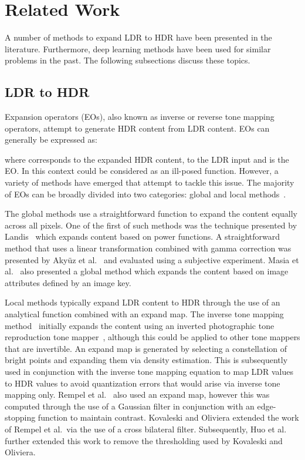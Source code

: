 \documentclass{egpubl}
\begin{document}
\section{\textbf{Related Work}}

A number of methods to expand LDR to HDR have been presented in the literature. Furthermore, deep learning methods have been used for similar
problems in the past. The following subsections discuss these topics.

\subsection{\textbf{LDR to HDR}}
Expansion operators (EOs), also known as inverse or reverse tone mapping operators, attempt to generate HDR content from LDR content. EOs can
generally be expressed as:



\noindent where  corresponds to the expanded HDR content,  to the LDR input and  is the EO. In this context  could be
considered as an ill-posed function. However, a variety of methods have emerged that attempt to tackle this issue. The majority of EOs can be broadly
divided into two categories: global and local methods~\cite{banterle2011hdrbook}.

The global methods use a straightforward function to expand the content equally
across all pixels. One of the first of such methods was the technique presented
by Landis~\cite{Landis02} which expands content based on power functions. A
straightforward method that uses a linear transformation combined with gamma
correction was presented by Aky\"{u}z et al.~\cite{akyuz06} and evaluated using
a subjective experiment. Masia et al.~\cite{masia09,masia2017dynamic} also
presented a global method which expands the content based on image attributes
defined by an image key.

Local methods typically expand LDR content to HDR through the use of an
analytical function combined with an expand map. The inverse tone mapping
method~\cite{banterle06inverse} initially expands the content using an inverted
photographic tone reproduction tone mapper~\cite{reinhard2002tmo}, although this could be applied to other tone
mappers that are invertible. An expand map is generated by selecting a constellation of bright
points and expanding them via density estimation. This is subsequently used in
conjunction with the inverse tone mapping equation to map LDR values to HDR
values to avoid quantization errors that would arise via inverse tone mapping
only. Rempel et al.~\cite{rempel06ldr2hdr} also used an expand map, however
this was computed through the use of a Gaussian filter in conjunction with an
edge-stopping function to maintain contrast. Kovaleski and Oliviera
\cite{Kovaleski+2014} extended the work of Rempel et al.\ via the use of a cross
bilateral filter. Subsequently, Huo et al.~\cite{Huo+2014} further extended
this work to remove the thresholding used by Kovaleski and Oliviera.
\end{document}
